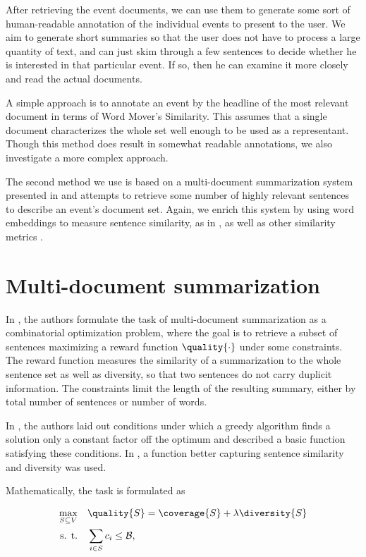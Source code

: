 After retrieving the event documents, we can use them to generate some sort of human-readable annotation of the individual events to present to the user. We aim to generate short summaries so that the user does not have to process a large quantity of text, and can just skim through a few sentences to decide whether he is interested in that particular event. If so, then he can examine it more closely and read the actual documents.

A simple approach is to annotate an event by the headline of the most relevant document in terms of Word Mover's Similarity. This assumes that a single document characterizes the whole set well enough to be used as a representant. Though this method does result in somewhat readable annotations, we also investigate a more complex approach.

The second method we use is based on a multi-document summarization system presented in \cite{multi-summarization-1, multi-summarization-2} and attempts to retrieve some number of highly relevant sentences to describe an event's document set. Again, we enrich this system by using word embeddings to measure sentence similarity, as in \cite{mogren-1}, as well as other similarity metrics \cite{mogren-2}.


\section{Multi-document summarization}
In \cite{multi-summarization-1}, the authors formulate the task of multi-document summarization as a combinatorial optimization problem, where the goal is to retrieve a subset of sentences maximizing a reward function $\quality{\cdot}$ under some constraints. The reward function measures the similarity of a summarization to the whole sentence set as well as diversity, so that two sentences do not carry duplicit information. The constraints limit the length of the resulting summary, either by total number of sentences or number of words.

In \cite{multi-summarization-1}, the authors laid out conditions under which a greedy algorithm finds a solution only a constant factor off the optimum and described a basic function satisfying these conditions. In \cite{multi-summarization-2}, a function better capturing sentence similarity and diversity was used.

Mathematically, the task is formulated as

\begin{equation}
\begin{alignedat}{-1}
\max_{S \subseteq V} & \quad \quality{S} = \coverage{S} + \lambda \diversity{S} \\
\text{s. t.} & \quad \sum_{i \in S}{\sentcost_{i}} \leq \budget,
\end{alignedat}
\end{equation}

